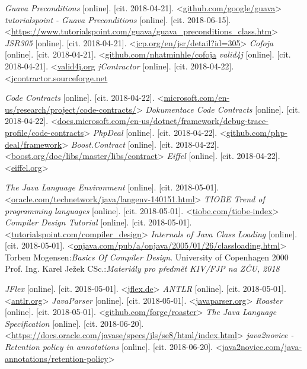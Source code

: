 \begin{thebibliography}{99}
 {\it Guava Preconditions} [online]. [cit. 2018-04-21]. \textless\url{github.com/google/guava}\textgreater
{} {\it tutorialspoint - Guava Preconditions} [online]. [cit. 2018-06-15]. \textless\url{https://www.tutorialspoint.com/guava/guava_preconditions_class.htm}\textgreater
{} {\it JSR305} [online]. [cit. 2018-04-21]. \textless\url{jcp.org/en/jsr/detail?id=305}\textgreater
{} {\it Cofoja} [online]. [cit. 2018-04-21]. \textless\url{github.com/nhatminhle/cofoja}
 {\it valid4j} [online]. [cit. 2018-04-21]. \textless\url{valid4j.org}	
 {\it jContractor} [online]. [cit. 2018-04-22]. \textless\url{jcontractor.sourceforge.net}

 {\it Code Contracts} [online]. [cit. 2018-04-22]. \textless\url{microsoft.com/en-us/research/project/code-contracts/}\textgreater
{} {\it Dokumentace Code Contracts} [online]. [cit. 2018-04-22]. \textless\url{docs.microsoft.com/en-us/dotnet/framework/debug-trace-profile/code-contracts}\textgreater
{} {\it PhpDeal} [online]. [cit. 2018-04-22]. \textless\url{github.com/php-deal/framework}\textgreater
{} {\it Boost.Contract} [online]. [cit. 2018-04-22]. \textless\url{boost.org/doc/libs/master/libs/contract}\textgreater
{} {\it Eiffel} [online]. [cit. 2018-04-22]. \textless\url{eiffel.org}\textgreater

 {\it The Java Language Environment} [online]. [cit. 2018-05-01]. \textless\url{oracle.com/technetwork/java/langenv-140151.html}\textgreater
{} {\it TIOBE Trend of programming languages} [online]. [cit. 2018-05-01]. \textless\url{tiobe.com/tiobe-index}\textgreater
{} {\it Compiler Design Tutorial} [online]. [cit. 2018-05-01]. \textless\url{tutorialspoint.com/compiler_design}\textgreater
{} {\it Internals of Java Class Loading} [online]. [cit. 2018-05-01]. \textless\url{onjava.com/pub/a/onjava/2005/01/26/classloading.html}\textgreater
{} Torben Mogensen:\emph{Basics Of Compiler Design}. University of Copenhagen 2000
 Prof. Ing. Karel Ježek CSc.:\emph{Materiály pro předmět KIV/FJP na ZČU, 2018}


 {\it JFlex} [online]. [cit. 2018-05-01]. \textless\url{jflex.de}\textgreater
{} {\it ANTLR} [online]. [cit. 2018-05-01]. \textless\url{antlr.org}\textgreater
{} {\it JavaParser} [online]. [cit. 2018-05-01]. \textless\url{javaparser.org}\textgreater
{} {\it Roaster} [online]. [cit. 2018-05-01]. \textless\url{github.com/forge/roaster}\textgreater
{} {\it The Java Language Specification} [online]. [cit. 2018-06-20]. \textless\url{https://docs.oracle.com/javase/specs/jls/se8/html/index.html}\textgreater
{} {\it java2novice - Retention policy in annotations} [online]. [cit. 2018-06-20]. \textless\url{java2novice.com/java-annotations/retention-policy}\textgreater




\end{thebibliography}
